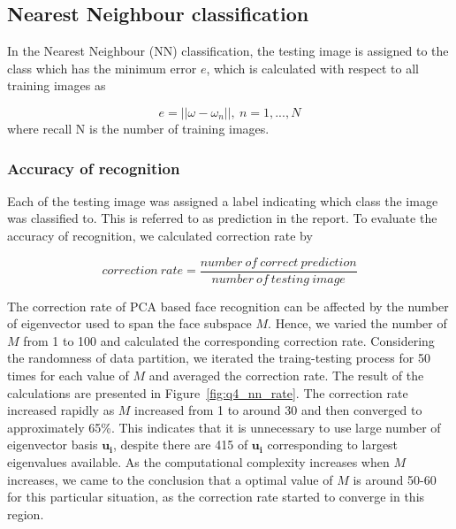 \documentclass[10pt,twocolumn,letterpaper]{article}
\begin{document}
\subsection{Nearest Neighbour classification}
In the Nearest Neighbour (NN) classification, the testing image is assigned to the class which has the minimum error $e$, which is calculated with respect to all training images as

\begin{equation}
	e = || \omega - \omega_n||, ~ n = 1, ..., N
\end{equation}
where recall N is the number of training images. 

\subsubsection{Accuracy of recognition}
Each of the testing image was assigned a label indicating which class the image was classified to. This is referred to as prediction in the report. To evaluate the accuracy of recognition, we calculated correction rate by 

\begin{equation}
	correction~ rate = \frac{number~of~correct~prediction}{number~of ~testing~image}
	\label{eq:R_correct}
\end{equation}

The correction rate of PCA based face recognition can be affected by the number of eigenvector used to span the face subspace $M$. Hence, we varied the number of $M$ from 1 to 100 and calculated the corresponding correction rate. Considering the randomness of data partition, we iterated the traing-testing process for 50 times for each value of $M$ and averaged the correction rate. The result of the calculations are presented in Figure~\ref{fig:q4_nn_rate}. The correction rate increased rapidly as $M$ increased from 1 to around 30 and then converged to approximately 65\%. This indicates that it is unnecessary to use large number of eigenvector basis $\boldsymbol{u_i}$, despite there are 415 of $\boldsymbol{u_i}$ corresponding to largest eigenvalues available. As the computational complexity increases when $M$ increases, we came to the conclusion that a optimal value of $M$ is around 50-60 for this particular situation, as the correction rate started to converge in this region. 
\end{document}
